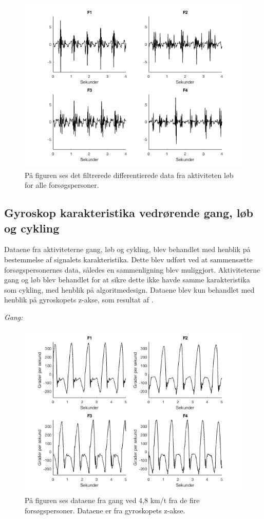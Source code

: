 \begin{figure}[H]
	\centering
	\includegraphics[scale=0.6]{figures/qBilag/loeb_diff}
	\caption{På figuren ses det filtrerede differentierede data fra aktiviteten løb for alle forsøgspersoner.}
	\label{fig:Ap_loebdiff}
\end{figure}

\subsection{Gyroskop karakteristika vedrørende gang, løb og cykling}
Dataene fra aktiviteterne gang, løb og cykling, blev behandlet med henblik på bestemmelse af signalets karakteristika. Dette blev udført ved at sammensætte forsøgspersonernes data, således en sammenligning blev muliggjort. Aktiviteterne gang og løb blev behandlet for at sikre dette ikke havde samme karakteristika som cykling, med henblik på algoritmedesign. Dataene blev kun behandlet med henblik på gyroskopets z-akse, som resultat af .  

\textit{Gang:}
\begin{figure}[H]
	\centering
	\includegraphics[scale=0.5]{figures/qBilag/gang_gyro}
	\caption{På figuren ses dataene fra gang ved 4,8 km/t fra de fire forsøgspersoner. Dataene er fra gyroskopets z-akse.}
	\label{fig:Ap_cykling}
\end{figure}

